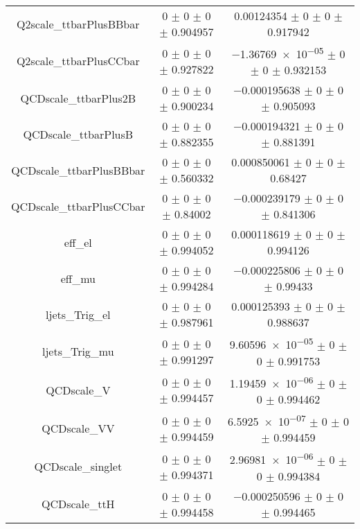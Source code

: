 \begin{table}
\begin{tabular}{ccc}
Q2scale\_ttbarPlusBBbar & \num{0} $\pm$ \num{0} $\pm$ \num{0} $\pm$ \num{0.904957} & \num{0.00124354} $\pm$ \num{0} $\pm$ \num{0} $\pm$ \num{0.917942}\\
Q2scale\_ttbarPlusCCbar & \num{0} $\pm$ \num{0} $\pm$ \num{0} $\pm$ \num{0.927822} & \num{-1.36769e-05} $\pm$ \num{0} $\pm$ \num{0} $\pm$ \num{0.932153}\\
QCDscale\_ttbarPlus2B & \num{0} $\pm$ \num{0} $\pm$ \num{0} $\pm$ \num{0.900234} & \num{-0.000195638} $\pm$ \num{0} $\pm$ \num{0} $\pm$ \num{0.905093}\\
QCDscale\_ttbarPlusB & \num{0} $\pm$ \num{0} $\pm$ \num{0} $\pm$ \num{0.882355} & \num{-0.000194321} $\pm$ \num{0} $\pm$ \num{0} $\pm$ \num{0.881391}\\
QCDscale\_ttbarPlusBBbar & \num{0} $\pm$ \num{0} $\pm$ \num{0} $\pm$ \num{0.560332} & \num{0.000850061} $\pm$ \num{0} $\pm$ \num{0} $\pm$ \num{0.68427}\\
QCDscale\_ttbarPlusCCbar & \num{0} $\pm$ \num{0} $\pm$ \num{0} $\pm$ \num{0.84002} & \num{-0.000239179} $\pm$ \num{0} $\pm$ \num{0} $\pm$ \num{0.841306}\\
eff\_el & \num{0} $\pm$ \num{0} $\pm$ \num{0} $\pm$ \num{0.994052} & \num{0.000118619} $\pm$ \num{0} $\pm$ \num{0} $\pm$ \num{0.994126}\\
eff\_mu & \num{0} $\pm$ \num{0} $\pm$ \num{0} $\pm$ \num{0.994284} & \num{-0.000225806} $\pm$ \num{0} $\pm$ \num{0} $\pm$ \num{0.99433}\\
ljets\_Trig\_el & \num{0} $\pm$ \num{0} $\pm$ \num{0} $\pm$ \num{0.987961} & \num{0.000125393} $\pm$ \num{0} $\pm$ \num{0} $\pm$ \num{0.988637}\\
ljets\_Trig\_mu & \num{0} $\pm$ \num{0} $\pm$ \num{0} $\pm$ \num{0.991297} & \num{9.60596e-05} $\pm$ \num{0} $\pm$ \num{0} $\pm$ \num{0.991753}\\
QCDscale\_V & \num{0} $\pm$ \num{0} $\pm$ \num{0} $\pm$ \num{0.994457} & \num{1.19459e-06} $\pm$ \num{0} $\pm$ \num{0} $\pm$ \num{0.994462}\\
QCDscale\_VV & \num{0} $\pm$ \num{0} $\pm$ \num{0} $\pm$ \num{0.994459} & \num{6.5925e-07} $\pm$ \num{0} $\pm$ \num{0} $\pm$ \num{0.994459}\\
QCDscale\_singlet & \num{0} $\pm$ \num{0} $\pm$ \num{0} $\pm$ \num{0.994371} & \num{2.96981e-06} $\pm$ \num{0} $\pm$ \num{0} $\pm$ \num{0.994384}\\
QCDscale\_ttH & \num{0} $\pm$ \num{0} $\pm$ \num{0} $\pm$ \num{0.994458} & \num{-0.000250596} $\pm$ \num{0} $\pm$ \num{0} $\pm$ \num{0.994465}\\

\end{tabular}
\end{table}
